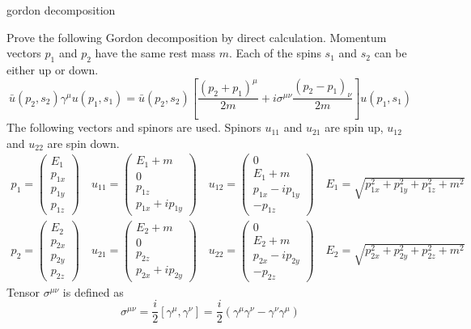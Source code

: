 \documentclass[12pt]{article}
\begin{document}
\begin{center}
{\sc gordon decomposition}
\end{center}

\noindent
Prove the following Gordon decomposition by direct calculation.
Momentum vectors $p_1$ and $p_2$ have the same rest mass $m$.
Each of the spins $s_1$ and $s_2$ can be either up or down.
$$
\bar{u}(p_2,s_2)\gamma^\mu u(p_1,s_1)=
\bar{u}(p_2,s_2)
\left[
\frac{(p_2+p_1)^\mu}{2m}+i\sigma^{\mu\nu}\frac{(p_2-p_1)_\nu}{2m}
\right]
u(p_1,s_1)
$$
The following vectors and spinors are used.
Spinors $u_{11}$ and $u_{21}$ are spin up, $u_{12}$ and $u_{22}$ are spin down.
\begin{gather*}
p_1=\begin{pmatrix}E_1\\p_{1x}\\p_{1y}\\p_{1z}\end{pmatrix}\quad
u_{11}=\begin{pmatrix}E_1+m\\0\\p_{1z}\\p_{1x}+ip_{1y}\end{pmatrix}\quad
u_{12}=\begin{pmatrix}0\\E_1+m\\p_{1x}-ip_{1y}\\-p_{1z}\end{pmatrix}\quad
E_1=\sqrt{p_{1x}^2+p_{1y}^2+p_{1z}^2+m^2}\\
p_2=\begin{pmatrix}E_2\\p_{2x}\\p_{2y}\\p_{2z}\end{pmatrix}\quad
u_{21}=\begin{pmatrix}E_2+m\\0\\p_{2z}\\p_{2x}+ip_{2y}\end{pmatrix}\quad
u_{22}=\begin{pmatrix}0\\E_2+m\\p_{2x}-ip_{2y}\\-p_{2z}\end{pmatrix}\quad
E_2=\sqrt{p_{2x}^2+p_{2y}^2+p_{2z}^2+m^2}
\end{gather*}
Tensor $\sigma^{\mu\nu}$ is defined as
$$
\sigma^{\mu\nu}=\frac{i}{2}\left[\gamma^\mu,\gamma^\nu\right]
=\frac{i}{2}\left(\gamma^\mu\gamma^\nu-\gamma^\nu\gamma^\mu\right)
$$
\end{document}
